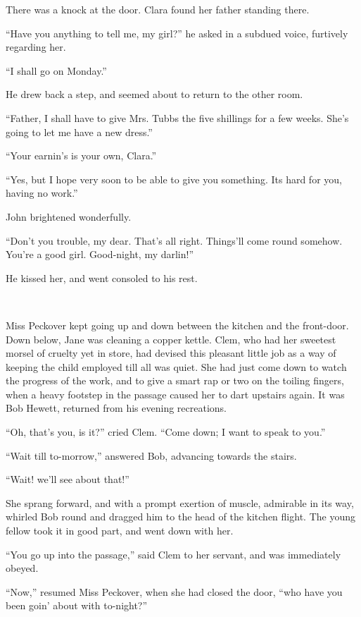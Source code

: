 There was a knock at the door. Clara found her father standing there.

``Have you anything to tell me, my girl?'' he asked in a subdued voice,
furtively regarding her.

``I shall go on Monday.''

He drew back a step, and seemed about to return to the other room.

``Father, I shall have to give Mrs. Tubbs the five shillings for a few
weeks. She's going to let me have a new dress.''

``Your earnin's is your own, Clara.''

``Yes, but I hope very soon to be able to give you something. Its hard
for you, having no work.''

John brightened wonderfully.

{\protect\hypertarget{82}{}{}}``Don't you trouble, my dear. That's all
right. Things'll come round somehow. You're a good girl. Good-night, my
darlin!''

He kissed her, and went consoled to his rest.

~

Miss Peckover kept going up and down between the kitchen and the
front-door. Down below, Jane was cleaning a copper kettle. Clem, who had
her sweetest morsel of cruelty yet in store, had devised this pleasant
little job as a way of keeping the child employed till all was quiet.
She had just come down to watch the progress of the work, and to give a
smart rap or two on the toiling fingers, when a heavy footstep in the
passage caused her to dart upstairs again. It was Bob Hewett, returned
from his evening recreations.

``Oh, that's you, is it?'' cried Clem. ``Come down; I want to speak to
you.''

``Wait till to-morrow,'' answered Bob, advancing towards the stairs.

``Wait! we'll see about that!''

She sprang forward, and with a prompt
{\protect\hypertarget{83}{}{}}exertion of muscle, admirable in its way,
whirled Bob round and dragged him to the head of the kitchen flight. The
young fellow took it in good part, and went down with her.

``You go up into the passage,'' said Clem to her servant, and was
immediately obeyed.

``Now,'' resumed Miss Peckover, when she had closed the door, ``who have
you been goin' about with to-night?''

